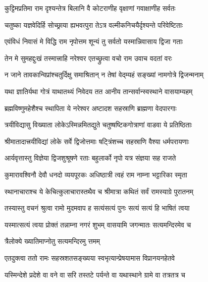 \twolineshloka
{कुट्टिमप्रतिमा राम दृश्यन्तेत्र बिलानि वै}
{कोटराणीह वृक्षाणां गवाक्षाणीह सर्वतः}%

\twolineshloka
{चतुष्का यज्ञवेदिर्हि सोच्छ्राया ह्यभवत्पुरा}
{तेऽत्र वल्मीकनिचयैर्दृश्यन्ते परिवेष्टिताः}%

\twolineshloka
{एवंविधं निवासं मे विद्धि राम नृपोत्तम}
{शून्यं तु सर्वतो यस्मान्निवासाय द्विजा गताः}%

\twolineshloka
{तेन मे सुमहद्दुःखं तस्मात्त्राहि नरेश्वर}
{एतच्छ्रुत्वा वचो राम उवाच वदतां वरः}%


\twolineshloka
{न जाने तावकान्विप्रांश्चतुर्दिक्षु समाश्रितान्}
{न तेषां वेद्म्यहं सङ्ख्यां नामगोत्रे द्विजन्मनाम्}%

\twolineshloka
{यथा ज्ञातिर्यथा गोत्रं याथातथ्यं निवेदय}
{तत आनीय तान्सर्वान्स्वस्थाने वासयाम्यहम्}%


\twolineshloka
{ब्रह्मविष्णुमहेशैश्च स्थापिता ये नरेश्वर}
{अष्टादश सहस्राणि ब्राह्मणा वेदपारगाः}%

\twolineshloka
{त्रयीविद्यासु विख्याता लोकेऽस्मिन्नमितद्युते}
{चतुष्षष्टिकगोत्राणां वाडवा ये प्रतिष्ठिताः}%

\twolineshloka
{श्रीमातादात्त्रयीविद्यां लोके सर्वे द्विजोत्तमाः}
{षट्त्रिंशच्च सहस्राणि वैश्या धर्मपरायणाः}%

\twolineshloka
{आर्यवृत्तास्तु विज्ञेया द्विजशुश्रूषणे रताः}
{बहुलार्को नृपो यत्र संज्ञया सह राजते}%

\twolineshloka
{कुमारावश्विनौ देवौ धनदो व्ययपूरकः}
{अधिष्ठात्री त्वहं राम नाम्ना भट्टारिका स्मृता}%


\twolineshloka
{स्थानाचाराश्च ये केचित्कुलाचारास्तथैव च}
{श्रीमात्रा कथितं सर्वं रामस्याग्रे पुरातनम्}%

\twolineshloka
{तस्यास्तु वचनं श्रुत्वा रामो मुदमवाप ह}
{सत्यंसत्यं पुनः सत्यं सत्यं हि भाषितं त्वया}%

\twolineshloka
{यस्मात्सत्यं त्वया प्रोक्तं तन्नाम्ना नगरं शुभम्}
{वासयामि जगन्मातः सत्यमन्दिरमेव च}%

\onelineshloka
{त्रैलोक्ये ख्यातिमाप्नोतु सत्यमन्दिरमु त्तमम्}%

\twolineshloka
{एतदुक्त्वा ततो रामः सहस्रशतसङ्ख्यया}
{स्वभृत्यान्प्रेषयामास विप्रानयनहेतवे}%

\twolineshloka
{यस्मिन्देशे प्रदेशे वा वने वा सरि तस्तटे}
{पर्यन्ते वा यथास्थाने ग्रामे वा तत्रतत्र च}%

